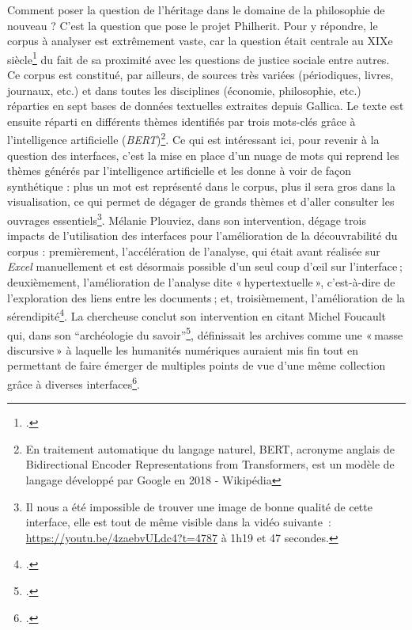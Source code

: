 Comment poser la question de l’héritage dans le domaine de la philosophie de nouveau ? C’est la question que pose le projet Philherit. Pour y répondre, le corpus à analyser est extrêmement vaste, car la question était centrale au XIXe siècle\footcite{plouviez2023} du fait de sa proximité avec les questions de justice sociale entre autres. Ce corpus est constitué, par ailleurs, de sources très variées (périodiques, livres, journaux, etc.) et dans toutes les disciplines (économie, philosophie, etc.) réparties en sept bases de données textuelles extraites depuis Gallica. Le texte est ensuite réparti en différents thèmes identifiés par trois mots-clés grâce à l’intelligence artificielle (\textit{BERT})\footnote{En traitement automatique du langage naturel, BERT, acronyme anglais de Bidirectional Encoder Representations from Transformers, est un modèle de langage développé par Google en 2018 - Wikipédia}. Ce qui est intéressant ici, pour revenir à la question des interfaces, c’est la mise en place d’un nuage de mots qui reprend les thèmes générés par l’intelligence artificielle et les donne à voir de façon synthétique : plus un mot est représenté dans le corpus, plus il sera gros dans la visualisation, ce qui permet de dégager de grands thèmes et d’aller consulter les ouvrages essentiels\footnote{Il nous a été impossible de trouver une image de bonne qualité de cette interface, elle est tout de même visible dans la vidéo suivante : \url{https://youtu.be/4zaebvULdc4?t=4787} à 1h19 et 47 secondes.}. Mélanie Plouviez, dans son intervention, dégage trois impacts de l’utilisation des interfaces pour l’amélioration de la découvrabilité du corpus : premièrement, l’accélération de l’analyse, qui était avant réalisée sur \textit{Excel} manuellement et est désormais possible d’un seul coup d’œil sur l’interface ; deuxièmement, l’amélioration de l’analyse dite « hypertextuelle », c’est-à-dire de l’exploration des liens entre les documents ; et, troisièmement, l’amélioration de la sérendipité\footcite{plouviez2023}. La chercheuse conclut son intervention en citant Michel Foucault qui, dans son \enquote{archéologie du savoir}\footcite{foucault_archeologie_2008}, définissait les archives comme une « masse discursive » à laquelle les humanités numériques auraient mis fin tout en permettant de faire émerger de multiples points de vue d’une même collection grâce à diverses interfaces\footcite{plouviez_philosophie_2023}.

